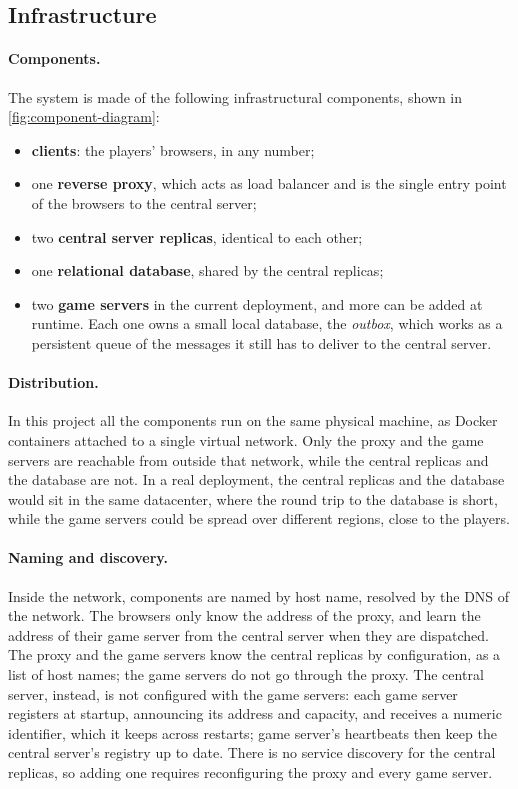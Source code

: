 \documentclass{scrartcl}
\begin{document}
\subsection{Infrastructure}\label{infrastructure}
\paragraph{Components.}
The system is made of the following infrastructural components, shown in \cref{fig:component-diagram}:
\begin{itemize}
    \item \textbf{clients}: the players' browsers, in any number;
    \item one \textbf{reverse proxy}, which acts as load balancer and is the single entry point of the browsers to the central server;
    \item two \textbf{central server replicas}, identical to each other;
    \item one \textbf{relational database}, shared by the central replicas;
    \item two \textbf{game servers} in the current deployment, and more can be added at runtime. Each one owns a small local database, the \emph{outbox}, which works as a persistent queue of the messages it still has to deliver to the central server.
\end{itemize}

\paragraph{Distribution.}
In this project all the components run on the same physical machine, as Docker containers attached to a single virtual network.
Only the proxy and the game servers are reachable from outside that network, while the central replicas and the database are not.
In a real deployment, the central replicas and the database would sit in the same datacenter, where the round trip to the database 
is short, while the game servers could be spread over different regions, close to the players.

\paragraph{Naming and discovery.}
Inside the network, components are named by host name, resolved by the DNS of the network.
The browsers only know the address of the proxy, and learn the address of their game server from the central server when they are dispatched.
The proxy and the game servers know the central replicas by configuration, as a list of host names; the game servers do not go through the proxy.
The central server, instead, is not configured with the game servers: each game server registers at startup, announcing its address and capacity, and receives a numeric identifier, which it keeps across restarts; game server's heartbeats then keep the central server's registry up to date.
There is no service discovery for the central replicas, so adding one requires reconfiguring the proxy and every game server.
\end{document}
